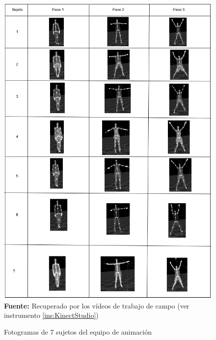 \begin{figure}[H]
	\caption{Fotogramas de 7 sujetos del equipo de animaci\'on}
	\label{fig:fotogramaCheerleader}
	\centering
	\includegraphics[width=445px,height=600px]{graphics/resultados/SECheerleaders.PNG} \\
	\textbf{Fuente:} Recuperado por los v\'ideos de trabajo de campo (ver instrumento \ref{ins:KinectStudio})
\end{figure}
